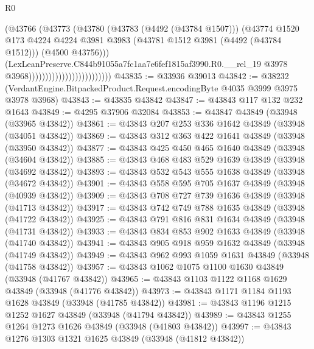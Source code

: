\begin{lexlean}{R0}
\begin{coremodule}
                                                (@43766
                                                  (@43773
                                                    (@43780
                                                      (@43783 (@4492 (@43784 @1507)))
                                                      (@43774
                                                        @1520
                                                        @173
                                                        @4224
                                                        @4224
                                                        @3981
                                                        @3983
                                                        (@43781 @1512 @3981 (@4492 (@43784 @1512)))
                                                        (@4500 @43756)))
                                                    (LexLeanPreserve.C844b91055a7fc1aa7e6fef1815af3990.R0.__rel_19
                                                      @3978
                                                      @3968)))))))))))))))))))))))))
@43835 := @33936 @39013
@43842 := @38232 (VerdantEngine.BitpackedProduct.Request.encodingByte @4035 @3999 @3975 @3978 @3968)
@43843 := @43835 @43842
@43847 := @43843 @117 @132 @232 @1643
@43849 := @4295 @37906 @32084
@43853 := @43847 @43849 (@33948 (@33965 @43842))
@43861 := @43843 @207 @253 @336 @1642 @43849 (@33948 (@34051 @43842))
@43869 := @43843 @312 @363 @422 @1641 @43849 (@33948 (@33950 @43842))
@43877 := @43843 @425 @450 @465 @1640 @43849 (@33948 (@34604 @43842))
@43885 := @43843 @468 @483 @529 @1639 @43849 (@33948 (@34692 @43842))
@43893 := @43843 @532 @543 @555 @1638 @43849 (@33948 (@34672 @43842))
@43901 := @43843 @558 @595 @705 @1637 @43849 (@33948 (@40939 @43842))
@43909 := @43843 @708 @727 @739 @1636 @43849 (@33948 (@41713 @43842))
@43917 := @43843 @742 @749 @788 @1635 @43849 (@33948 (@41722 @43842))
@43925 := @43843 @791 @816 @831 @1634 @43849 (@33948 (@41731 @43842))
@43933 := @43843 @834 @853 @902 @1633 @43849 (@33948 (@41740 @43842))
@43941 := @43843 @905 @918 @959 @1632 @43849 (@33948 (@41749 @43842))
@43949 := @43843 @962 @993 @1059 @1631 @43849 (@33948 (@41758 @43842))
@43957 := @43843 @1062 @1075 @1100 @1630 @43849 (@33948 (@41767 @43842))
@43965 := @43843 @1103 @1122 @1168 @1629 @43849 (@33948 (@41776 @43842))
@43973 := @43843 @1171 @1184 @1193 @1628 @43849 (@33948 (@41785 @43842))
@43981 := @43843 @1196 @1215 @1252 @1627 @43849 (@33948 (@41794 @43842))
@43989 := @43843 @1255 @1264 @1273 @1626 @43849 (@33948 (@41803 @43842))
@43997 := @43843 @1276 @1303 @1321 @1625 @43849 (@33948 (@41812 @43842))

\end{coremodule}
\end{lexlean}
